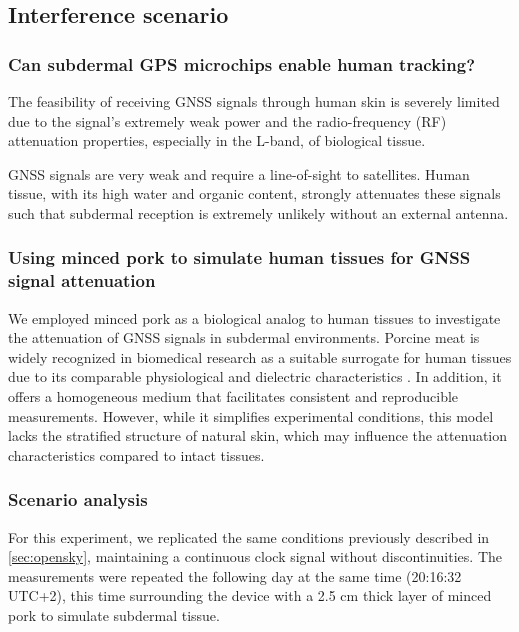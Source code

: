 \subsection{Interference scenario}
\label{interference}
\subsubsection{Can subdermal GPS microchips enable human tracking?}
The feasibility of receiving GNSS signals through human skin is severely limited due to the signal's extremely weak power and the radio-frequency (RF) attenuation properties, especially in the L-band, of biological tissue. 

GNSS signals are very weak and require a line-of-sight to satellites. Human tissue, with its high water and organic content, strongly attenuates these signals such that subdermal reception is extremely unlikely without an external antenna.

\subsubsection{Using minced pork to simulate human tissues for GNSS signal attenuation}
We employed minced pork as a biological analog to human tissues to investigate the attenuation of GNSS signals in subdermal environments. Porcine meat is widely recognized in biomedical research as a suitable surrogate for human tissues due to its comparable physiological and dielectric characteristics \cite{ranamukhaarachchi2016micromechanical}. In addition, it offers a homogeneous medium that facilitates consistent and reproducible measurements. However, while it simplifies experimental conditions, this model lacks the stratified structure of natural skin, which may influence the attenuation characteristics compared to intact tissues.

\subsubsection{Scenario analysis}
For this experiment, we replicated the same conditions previously described in \ref{sec:opensky}, maintaining a continuous clock signal without discontinuities. The measurements were repeated the following day at the same time (20:16:32 UTC+2), this time surrounding the device \cite{samsungs23ultra} with a 2.5 cm thick layer of minced pork to simulate subdermal tissue.

